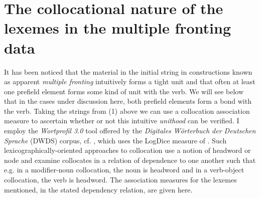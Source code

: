 \documentclass[11pt,a4paper,fleqn]{article}
\begin{document}

 
\begin{exe}
 \ex \begin{xlist}
 \end{xlist}
\end{exe}





\section{The collocational nature of the lexemes in the multiple fronting data}
It has been noticed that the material in the initial string in constructions known as apparent \textit{multiple fronting} intuitively forms a tight unit and 
that often at least one prefield element forms some kind of unit with the verb. We will see below that in the cases under discussion here, both prefield elements form 
a bond with the verb. Taking the 
strings from (1) above we can use a collocation association measure to ascertain whether or not this intuitive \textit{unithood} can be verified. 
I employ the \textit{Wortprofil 3.0} tool offered by the \textit{Digitales Wörterbuch der Deutschen Sprache} 
(DWDS) corpus, cf. \cite{DidakowskiGeyken2013}, which uses the LogDice measure of \cite{Rychly2008}.
Such lexicographically-oriented approaches to collocation use a notion of headword or node and examine collocates in a 
relation of dependence to one another such that e.g. in a modifier-noun collocation, the noun is headword and in a verb-object collocation, the verb is headword. 
The association measures for the lexemes mentioned, 
in the stated dependency relation, are given here.  
\end{document}

